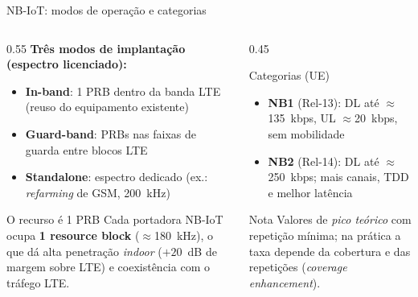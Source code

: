 \documentclass[aspectratio=169,11pt]{beamer}
\begin{document}
\begin{frame}{NB-IoT: modos de operação e categorias}
  \begin{columns}
    \begin{column}{0.55\textwidth}
      \textbf{Três modos de implantação (espectro licenciado):}
      \begin{itemize}
        \item \textbf{In-band}: 1 PRB dentro da banda LTE (reuso do equipamento existente)
        \item \textbf{Guard-band}: PRBs nas faixas de guarda entre blocos LTE
        \item \textbf{Standalone}: espectro dedicado (ex.: \emph{refarming} de GSM, 200~kHz)
      \end{itemize}
      \pause
      \begin{block}{O recurso é 1 PRB}
        Cada portadora NB-IoT ocupa \textbf{1 resource block} ($\approx$180~kHz), o que dá alta penetração \emph{indoor} ($+20$~dB de margem sobre LTE) e coexistência com o tráfego LTE.
      \end{block}
    \end{column}
    \begin{column}{0.45\textwidth}
      \begin{block}{Categorias (UE)}
        \begin{itemize}
          \item \textbf{NB1} (Rel-13): DL até $\approx$135~kbps, UL $\approx$20~kbps, sem mobilidade
          \item \textbf{NB2} (Rel-14): DL até $\approx$250~kbps; mais canais, TDD e melhor latência
        \end{itemize}
      \end{block}
      \begin{alertblock}{Nota}
        Valores de \emph{pico teórico} com repetição mínima; na prática a taxa depende da cobertura e das repetições (\emph{coverage enhancement}).
      \end{alertblock}
    \end{column}
  \end{columns}
\end{frame}
\end{document}
